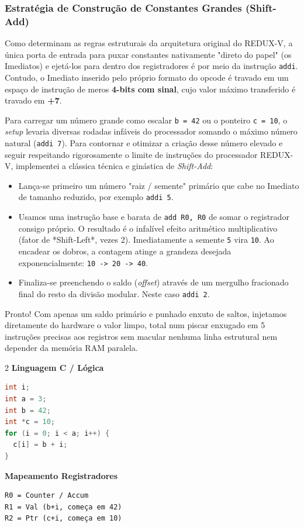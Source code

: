 \documentclass[11pt,a4paper]{article}
\begin{document}
\subsubsection*{Estratégia de Construção de Constantes Grandes (Shift-Add)}
Como determinam as regras estruturais da arquitetura original do REDUX-V, a única porta de entrada para puxar constantes nativamente "direto do papel" (os Imediatos) e ejetá-los para dentro dos registradores é por meio da instrução \texttt{addi}. Contudo, o Imediato inserido pelo próprio formato do opcode é travado em um espaço de instrução de meros \textbf{4-bits com sinal}, cujo valor máximo transferido é travado em \textbf{+7}.

Para carregar um número grande como escalar \texttt{b = 42} ou o ponteiro \texttt{c = 10}, o \textit{setup} levaria diversas rodadas infáveis do processador somando o máximo número natural  (\texttt{addi 7}). Para contornar e otimizar a criação desse número elevado e seguir respeitando rigorosamente o limite de instruções do processador REDUX-V, implementei a clássica técnica e ginástica de \textit{Shift-Add}:
\begin{itemize}
    \item Lança-se primeiro um número "raiz / semente" primário que cabe no Imediato de tamanho reduzido, por exemplo \texttt{addi 5}.
    \item Usamos uma instrução base e barata de \texttt{add R0, R0} de somar o registrador consigo próprio. O resultado é o infalível efeito aritmético multiplicativo (fator de *Shift-Left*, vezes 2). Imediatamente a semente \texttt{5} vira \texttt{10}. Ao encadear os dobros, a contagem atinge a grandeza desejada exponencialmente: \texttt{10 -> 20 -> 40}.
    \item Finaliza-se preenchendo o saldo (\textit{offset}) através de um mergulho fracionado final do resto da divisão modular. Neste caso \texttt{addi 2}.
\end{itemize}
Pronto! Com apenas um saldo primário e punhado enxuto de saltos, injetamos diretamente do hardware o valor limpo, total num piscar enxugado em 5 instruções precisas aos registros sem macular nenhuma linha estrutural nem depender da memória RAM paralela.

\vspace{0.5cm}
\begin{multicols}{2}
\textbf{Linguagem C / Lógica}
\begin{lstlisting}[language=C]
int i;
int a = 3;
int b = 42;
int *c = 10;
for (i = 0; i < a; i++) {
  c[i] = b + i;
}
\end{lstlisting}

\columnbreak

\textbf{Mapeamento Registradores}
\begin{lstlisting}
R0 = Counter / Accum
R1 = Val (b+i, começa em 42)
R2 = Ptr (c+i, começa em 10)
\end{lstlisting}
\end{multicols}
\end{document}
